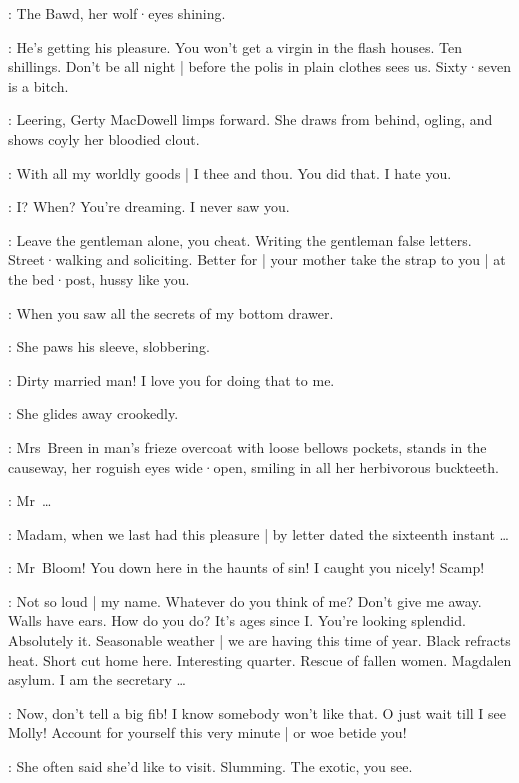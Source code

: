 :
The Bawd,
her wolf·eyes shining.

\Bawd:
He's getting his pleasure.
You won't get a virgin in the flash houses.
Ten shillings.
Don't be all night |
before the polis in plain clothes sees us.
Sixty·seven is a bitch.

:
Leering,
Gerty MacDowell limps forward.
She draws from behind,
ogling,
and shows coyly her bloodied clout.

\Gerty:
With all my worldly goods |
I thee and thou.
You did that.
I hate you.

\Bloom:
I?
When?
You're dreaming.
I never saw you.

\Bawd:
Leave the gentleman alone,
you cheat.
Writing the gentleman false letters.
Street·walking and soliciting.
Better for |
your mother take the strap to you |
at the bed·post,
hussy like you.

\Gerty:
\sout{}
When you saw all the secrets of my bottom drawer.

:
She paws his sleeve,
slobbering.

\Gerty:
Dirty married man!
I love you for doing that to me.

:
She glides away crookedly.

:
Mrs~Breen in man's frieze overcoat with loose bellows pockets,
stands in the causeway,
her roguish eyes wide·open,
smiling in all her herbivorous buckteeth.

\MrsBreen:
Mr~\ldots
{}

\Bloom:
Madam,
when we last had this pleasure |
by letter dated the sixteenth instant \ldots

\MrsBreen:
Mr~Bloom!
You down here in the haunts of sin!
I caught you nicely!
Scamp!

\Bloom:
Not so loud |
my name.
Whatever do you think of me?
Don't give me away.
Walls have ears.
How do you do?
It's ages since I.
You're looking splendid.
Absolutely it.
Seasonable weather |
we are having this time of year.
Black refracts heat.
Short cut home here.
Interesting quarter.
Rescue of fallen women.
Magdalen asylum.
I am the secretary \ldots

\MrsBreen:
Now,
don't tell a big fib!
I know somebody won't like that.
O just wait till I see Molly!
Account for yourself this very minute |
or woe betide you!

\Bloom:
She often said she'd like to visit.
Slumming.
The exotic,
you see.

